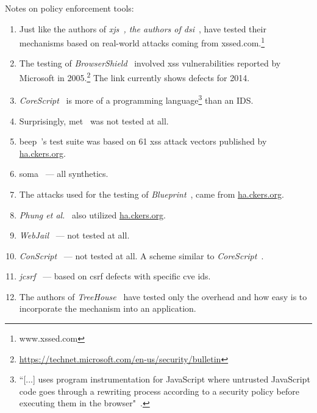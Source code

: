 \documentclass[conference]{IEEEtran}
\begin{document}
Notes on policy enforcement tools:
\begin{enumerate}
\item Just like the authors of {\it x{\sc js}~\cite{APKLM10},
the authors of {\sc dsi}}~\cite{NSS06}, have tested
their mechanisms based on real-world attacks coming from
{\sc xss}ed.com.\footnote{www.xssed.com}
\item The testing of {\it BrowserShield}~\cite{RDWDE07}
involved {\sc xss} vulnerabilities reported by Microsoft
in 2005.\footnote{\url{https://technet.microsoft.com/en-us/security/bulletin}}
The link currently shows defects for 2014.
\item {\it CoreScript}~\cite{YCIS07} is more of a programming
language\footnote{``[...] uses program instrumentation for
JavaScript where untrusted JavaScript
code goes through a rewriting process according to a security policy
before executing them in the browser"~\cite{PSC09}.}
than an {\sc IDS}.
\item Surprisingly, {\sc met}~\cite{ELX07} was not tested at all.
\item {\sc beep}~\cite{TNH07}'s test suite was based on 61 {\sc xss}
attack vectors published by \url{ha.ckers.org}.
\item {\sc soma}~\cite{OWVS08} --- all synthetics.
\item The attacks used for the testing of {\it Blueprint}~\cite{LV09},
came from \url{ha.ckers.org}.
\item {\it Phung et al.}~\cite{PSC09} also utilized \url{ha.ckers.org}.
\item {\it WebJail}~\cite{VDDPJ11} --- not tested at all.
\item {\it ConScript}~\cite{ML10} --- not tested at all. A scheme
similar to {\it CoreScript}~\cite{YCIS07}.
\item {\it j{\sc csrf}}~\cite{PS11} --- based on {\sc csrf}
defects with specific {\sc cve id}s.
\item The authors of {\it TreeHouse}~\cite{IW12} have tested
only the overhead and how easy is to incorporate the mechanism
into an application.
\end{enumerate}
\end{document}
